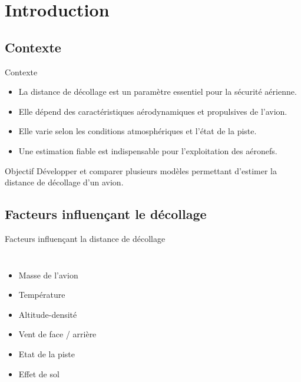 \section{Introduction}
\subsection{Contexte}
\begin{frame}{Contexte}
	\begin{itemize}
		\item La distance de décollage est un paramètre essentiel pour la sécurité aérienne.
		\item Elle dépend des caractéristiques aérodynamiques et propulsives de l'avion.
		\item Elle varie selon les conditions atmosphériques et l'état de la piste.
		\item Une estimation fiable est indispensable pour l'exploitation des aéronefs.
	\end{itemize}
	
	\vspace{0.4cm}
	
	\begin{block}{Objectif}
		Développer et comparer plusieurs modèles permettant d'estimer la distance de décollage d'un avion.
	\end{block}
\end{frame}

\subsection{Facteurs influençant le décollage}

\begin{frame}{Facteurs influençant la distance de décollage}
	
	\begin{columns}
		
		
		\begin{itemize}
			\item Masse de l'avion
			\item Température
			\item Altitude-densité
			\item Vent de face / arrière
			\item Etat de la piste
			\item Effet de sol
		\end{itemize}
		
		
		
		
	\end{columns}
	
\end{frame}
